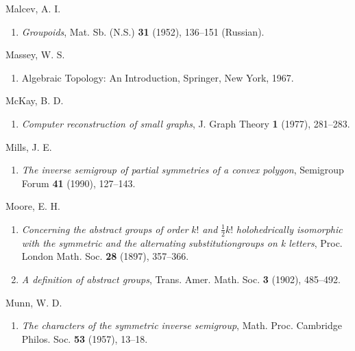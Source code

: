 \documentclass{surv-l}
\numberwithin{equation}{section}
\numberwithin{table}{section}
\numberwithin{figure}{section}
\theoremstyle{plain}
\theoremstyle{definition}
\begin{document}
\begin{thebibliography}{}
\item[] Malcev, A. I.
\begin{enumerate}
\item \label{bib49} \emph{Groupoids}, Mat. Sb. (N.S.) \textbf{31} (1952), 136--151
(Russian).
\end{enumerate}

\item[] Massey, W. S.
\begin{enumerate}
\item \label{bib50} Algebraic Topology: An Introduction, Springer, New York,
1967.
\end{enumerate}

\item[] McKay, B. D.
\begin{enumerate}
\item \label{bib51} \emph{Computer reconstruction of small graphs}, J.
Graph Theory \textbf{1} (1977), 281--283.
\end{enumerate}

\item[] Mills, J. E.
\begin{enumerate}
\item \label{bib52} \emph{The inverse semigroup of partial symmetries of a
convex polygon}, Semigroup Forum \textbf{41} (1990),
127--143.
\end{enumerate}

\item[] Moore, E. H.
\begin{enumerate}
\item \label{bib53} \emph{Concerning the abstract groups of order} $k!$
\emph{and} $\frac{1}{2}k!$ \emph{holohedrically isomorphic
with the symmetric and the alternating substitutiongroups
on k letters}, Proc. London Math. Soc. \textbf{28} (1897),
357--366.

\item \label{bib53a} \emph{A definition of abstract groups}, Trans. Amer.
Math. Soc. \textbf{3} (1902), 485--492.
\end{enumerate}

\item[] Munn, W. D.
\begin{enumerate}
\item \label{bib54} \emph{The characters of the symmetric inverse
semigroup}, Math. Proc. Cambridge Philos. Soc. \textbf{53}
(1957), 13--18.
\end{enumerate}


\end{thebibliography}
\end{document}
